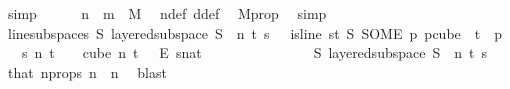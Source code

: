 \begin{isabellebody}
\ simp\isanewline
\ \ \ \ \isamarkupfalse%
\ {\isachardoublequoteopen}n\ {\isacharplus}{\kern0pt}\ m\ {\isacharequal}{\kern0pt}\ M{\isacharprime}{\kern0pt}{\isachardoublequoteclose}\ \isamarkupfalse%
\ n{\isacharunderscore}{\kern0pt}def\ d{\isacharunderscore}{\kern0pt}def\ \isamarkupfalse%
\ M{\isacharprime}{\kern0pt}{\isacharunderscore}{\kern0pt}prop\ \isamarkupfalse%
\ simp\isanewline
\ \ \ \ \isamarkupfalse%
\ line{\isacharunderscore}{\kern0pt}subspace{\isacharunderscore}{\kern0pt}s{\isacharcolon}{\kern0pt}\ {\isachardoublequoteopen}{\isasymexists}S{\isachardot}{\kern0pt}\ layered{\isacharunderscore}{\kern0pt}subspace\ S\ {}\ n\ t\ s\ {\isasymchi}\ {\isasymand}\ is{\isacharunderscore}{\kern0pt}line\ {\isacharparenleft}{\kern0pt}{\isasymlambda}s{\isasymin}{\isacharbraceleft}{\kern0pt}{\isachardot}{\kern0pt}{\isachardot}{\kern0pt}{\isacharless}{\kern0pt}t{\isacharplus}{\kern0pt}{}{\isacharbraceright}{\kern0pt}{\isachardot}{\kern0pt}\ S\ {\isacharparenleft}{\kern0pt}SOME\ p{\isachardot}{\kern0pt}\ p{\isasymin}cube\ {}\ {\isacharparenleft}{\kern0pt}t{\isacharplus}{\kern0pt}{}{\isacharparenright}{\kern0pt}\ {\isasymand}\ p\ {}\ {\isacharequal}{\kern0pt}\ s{\isacharparenright}{\kern0pt}{\isacharparenright}{\kern0pt}\ n\ {\isacharparenleft}{\kern0pt}t{\isacharplus}{\kern0pt}{}{\isacharparenright}{\kern0pt}{\isachardoublequoteclose}\ \ {\isachardoublequoteopen}{\isasymchi}\ {\isasymin}\ {\isacharparenleft}{\kern0pt}cube\ n\ {\isacharparenleft}{\kern0pt}t\ {\isacharplus}{\kern0pt}\ {}{\isacharparenright}{\kern0pt}{\isacharparenright}{\kern0pt}\ {\isasymrightarrow}\isactrlsub E\ {\isacharbraceleft}{\kern0pt}{\isachardot}{\kern0pt}{\isachardot}{\kern0pt}{\isacharless}{\kern0pt}s{\isacharcolon}{\kern0pt}{\isacharcolon}{\kern0pt}nat{\isacharbraceright}{\kern0pt}{\isachardoublequoteclose}\ \ {\isasymchi}\ \isanewline
\ \ \ \ \isamarkupfalse%
{\isacharminus}{\kern0pt}\isanewline
\ \ \ \ \ \ \isamarkupfalse%
\ {\isachardoublequoteopen}{\isasymexists}S{\isachardot}{\kern0pt}\ layered{\isacharunderscore}{\kern0pt}subspace\ S\ {}\ n\ t\ s\ {\isasymchi}{\isachardoublequoteclose}\ \isamarkupfalse%
\ that\ n{\isacharprime}{\kern0pt}{\isacharunderscore}{\kern0pt}props\ {\isacartoucheopen}n\ {\isasymge}\ n{\isacharprime}{\kern0pt}{\isacartoucheclose}\ \isamarkupfalse%
\ blast\isanewline
\ \ \ \ \ \ \isamarkupfalse%

\end{isabellebody}
